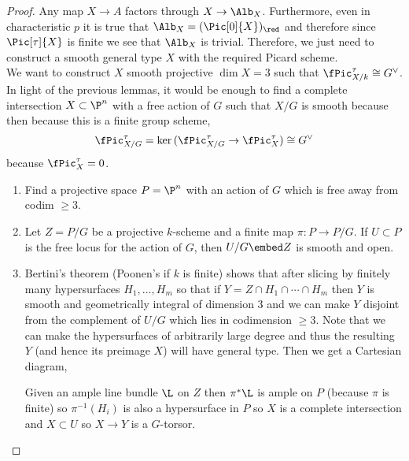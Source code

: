 \documentclass[12pt]{article}
\begin{document}
\begin{proof}
Any map $X \to A$ factors through $X \to \Alb_X$. Furthermore, even in characteristic $p$ it is true that $\Alb_X = (\Pic[0]{X})_{\red}$ and therefore since $\Pic[\tau]{X}$ is finite we see that $\Alb_X$ is trivial. Therefore, we just need to construct a smooth general type $X$ with the required Picard scheme. 
\bigskip\\
We want to construct $X$ smooth projective $\dim{X} = 3$ such that $\fPic^\tau_{X/k} \cong G^\vee$. In light of the previous lemmas, it would be enough to find a complete intersection $X \subset \P^n$ with a free action of $G$ such that $X / G$ is smooth because then because this is a finite group scheme,
\[ \fPic^\tau_{X/G} = \ker{(\fPic^\tau_{X/G} \to \fPic^\tau_{X})} \cong G^\vee \]
because $\fPic^\tau_X = 0$. 

\begin{enumerate}
\item Find a projective space $P = \P^n$ with an action of $G$ which is free away from codim $\ge 3$. 

\item Let $Z = P / G$ be a projective $k$-scheme and a finite map $\pi : P \to P / G$. If $U \subset P$ is the free locus for the action of $G$, then $U / G \embed Z$ is smooth and open.

\item Bertini's theorem (Poonen's if $k$ is finite) shows that after slicing by finitely many hypersurfaces $H_1, \dots, H_m$ so that if $Y = Z \cap H_1 \cap \cdots \cap H_m$ then $Y$ is smooth and geometrically integral of dimension $3$ and we can make $Y$ disjoint from the complement of $U/G$ which lies in codimension $\ge 3$. Note that we can make the hypersurfaces of arbitrarily large degree and thus the resulting $Y$ (and hence its preimage $X$) will have general type. Then we get a Cartesian diagram,
\begin{center}
\end{center}
Given an ample line bundle $\L$ on $Z$ then $\pi^* \L$ is ample on $P$ (because $\pi$ is finite) so $\pi^{-1}(H_i)$ is also a hypersurface in $P$ so $X$ is a complete intersection and $X \subset U$ so $X \to Y$ is a $G$-torsor. 
\end{enumerate}


\end{proof}
\end{document}
